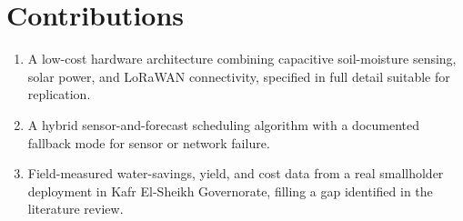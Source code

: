 \section{Contributions}
\begin{enumerate}[label=\textbf{C\arabic*.}, leftmargin=2.2em]
\item A low-cost hardware architecture combining capacitive soil-moisture sensing, solar
      power, and LoRaWAN connectivity, specified in full detail suitable for replication.
\item A hybrid sensor-and-forecast scheduling algorithm with a documented fallback mode for
      sensor or network failure.
\item Field-measured water-savings, yield, and cost data from a real smallholder deployment
      in Kafr El-Sheikh Governorate, filling a gap identified in the literature review.
\end{enumerate}
